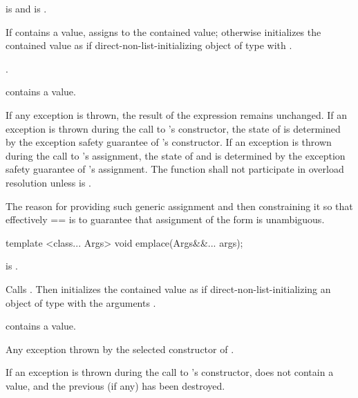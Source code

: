 \begin{itemdescr}
\pnum
\requires
{} is  and  is .

\pnum
\effects
If  contains a value, assigns  to the contained value; otherwise initializes the contained value as if direct-non-list-initializing object of type  with .

\pnum
\returns
{}.

\pnum
\postcondition
{} contains a value.

\pnum
\remarks
If any exception is thrown, the result of the expression  remains unchanged. If an exception is thrown during the call to 's constructor, the state of  is determined by the exception safety guarantee of 's constructor. If an exception is thrown during the call to 's assignment, the state of  and  is determined by the exception safety guarantee of 's assignment.
The function shall not participate in overload resolution unless
 is .

\pnum
\realnotes
The reason for providing such generic assignment and then constraining it so that effectively  ==  is to guarantee that assignment of the form  is unambiguous.
\end{itemdescr}

%
%
\begin{itemdecl}
template <class... Args> void emplace(Args&&... args);
\end{itemdecl}

\begin{itemdescr}
\pnum
\requires
{} is .

\pnum
\effects
Calls . Then initializes the contained value as if direct-non-list-initializing an object of type  with the arguments .

\pnum
\postcondition
{} contains a value.

\pnum
\throws
Any exception thrown by the selected constructor of .

\pnum
\remarks
If an exception is thrown during the call to 's constructor,  does not contain a value, and the previous  (if any) has been destroyed.
\end{itemdescr}

